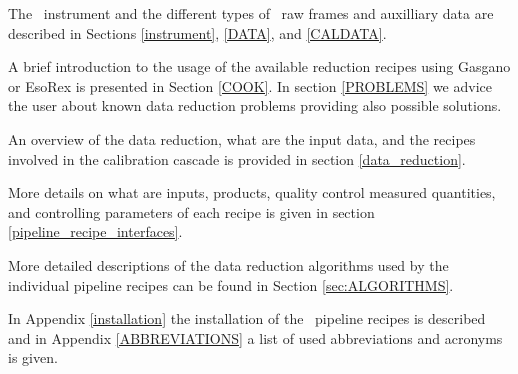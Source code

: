 

The \instname\, instrument and the different types of \instname\, raw frames 
and auxilliary data are described in Sections \ref{instrument}, \ref{DATA}, and \ref{CALDATA}.


A brief introduction to the usage of the available reduction recipes 
using Gasgano or EsoRex is presented in Section \ref{COOK}.
In section \ref{PROBLEMS} we advice the user 
about known data reduction problems providing also possible solutions.

An overview of the data reduction, what 
are the input data, and the recipes involved in the calibration cascade 
is provided in section \ref{data_reduction}.


More details on what are inputs, products, quality control measured quantities,
 and controlling parameters of each recipe is given 
in section \ref{pipeline_recipe_interfaces}.

More detailed descriptions of the data reduction algorithms used by
the individual pipeline recipes can be found in Section \ref{sec:ALGORITHMS}.


In Appendix \ref{installation} the installation of the \pipename\, pipeline 
recipes is described and 
in Appendix \ref{ABBREVIATIONS} a list of used abbreviations and acronyms 
is given.

